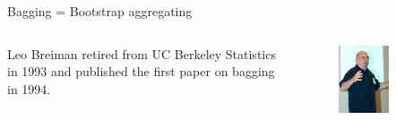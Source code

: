 \documentclass[mathserif, aspectratio=169]{beamer}
\begin{document}
\begin{frame}{}

\begin{center}
\LARGE Bagging = Bootstrap aggregating
\end{center}

\begin{columns}
Leo Breiman retired from UC Berkeley Statistics in 1993 and published the first paper on bagging in 1994.  \\~\\

\begin{figure}
\includegraphics[width=0.6\textwidth]{Leo_Breiman}
\caption*{}
\end{figure}
\end{columns}
\end{frame}
\end{document}

